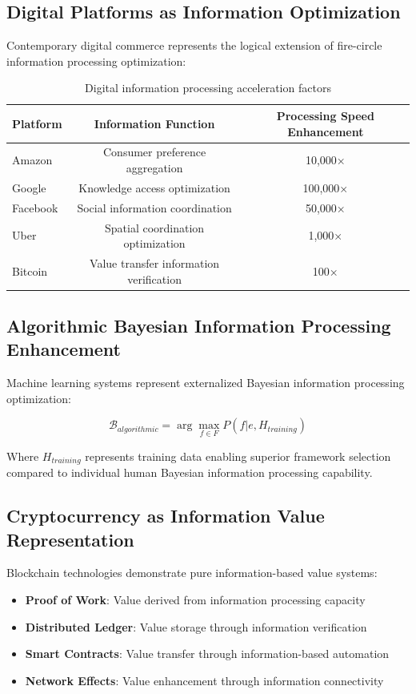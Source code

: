 \documentclass[12pt,a4paper]{article}
\begin{document}
\subsection{Digital Platforms as Information Optimization}

Contemporary digital commerce represents the logical extension of fire-circle information processing optimization:

\begin{table}[H]
\centering
\begin{tabular}{lcc}
\toprule
\textbf{Platform} & \textbf{Information Function} & \textbf{Processing Speed Enhancement} \\
\midrule
Amazon & Consumer preference aggregation & 10,000× \\
Google & Knowledge access optimization & 100,000× \\
Facebook & Social information coordination & 50,000× \\
Uber & Spatial coordination optimization & 1,000× \\
Bitcoin & Value transfer information verification & 100× \\
\bottomrule
\end{tabular}
\caption{Digital information processing acceleration factors}
\end{table}

\subsection{Algorithmic Bayesian Information Processing Enhancement}

Machine learning systems represent externalized Bayesian information processing optimization:

\begin{equation}
\mathcal{B}_{algorithmic} = \arg\max_{f \in F} P(f | e, H_{training})
\end{equation}

Where $H_{training}$ represents training data enabling superior framework selection compared to individual human Bayesian information processing capability.

\subsection{Cryptocurrency as Information Value Representation}

Blockchain technologies demonstrate pure information-based value systems:

\begin{itemize}
\item \textbf{Proof of Work}: Value derived from information processing capacity
\item \textbf{Distributed Ledger}: Value storage through information verification
\item \textbf{Smart Contracts}: Value transfer through information-based automation
\item \textbf{Network Effects}: Value enhancement through information connectivity
\end{itemize}
\end{document}
